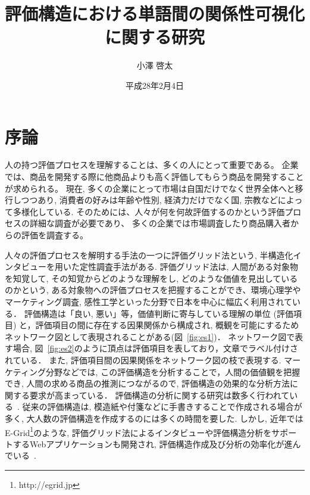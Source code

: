 \documentclass[syuuron]{kuee}
\title{評価構造における単語間の関係性可視化に関する研究}
\author{小澤 啓太}
\date{平成28年2月4日}
\begin{document}
\maketitle
\tableofcontents


\chapter{序論}
	人の持つ評価プロセスを理解することは、多くの人にとって重要である。
	企業では、商品を開発する際に他商品よりも高く評価してもらう商品を開発することが求められる。
	現在, 多くの企業にとって市場は自国だけでなく世界全体へと移行しつつあり, 
	消費者の好みは年齢や性別, 経済力だけでなく国, 宗教などによって多様化している. 
	そのためには、人々が何を何故評価するのかという評価プロセスの詳細な調査が必要であり、
	多くの企業では市場調査したり商品購入者からの評価を調査する。
	
	人々の評価プロセスを解明する手法の一つに評価グリッド法という, 半構造化インタビューを用いた定性調査手法がある. 
	評価グリッド法は, 人間がある対象物を知覚して, その知覚からどのような理解をし, どのような価値を見出しているのかという, 
	ある対象物への評価プロセスを把握することができ、環境心理学やマーケティング調査, 感性工学といった分野で日本を中心に幅広く利用されている\cite{sen1}．
	評価構造は「良い, 悪い」等，価値判断に寄与している理解の単位 (評価項目) と，評価項目の間に存在する因果関係から構成され, 
	概観を可能にするためネットワーク図として表現されることがある(図~\ref{fig:es1})．
	ネットワーク図で表す場合, 図~\ref{fig:es2}のように頂点は評価項目を表しており，文章でラベル付けされている．
	また, 評価項目間の因果関係をネットワーク図の枝で表現する. 
	マーケティング分野などでは, この評価構造を分析することで，人間の価値観を把握でき, 人間の求める商品の推測につながるので, 
	評価構造の効果的な分析方法に関する要求が高まっている\cite{egm6, egm7}．
	評価構造の分析に関する研究は数多く行われている~\cite{egm8, egm9}. 
	従来の評価構造は, 模造紙や付箋などに手書きすることで作成される場合が多く, 大人数の評価構造を作成するのには多くの時間を要した. 
	しかし, 近年ではE-Grid\footnote{http://egrid.jp}のような, 評価グリッド法によるインタビューや評価構造分析をサポートするWebアプリケーションも開発され, 
	評価構造作成及び分析の効率化が進んでいる~\cite{egm6, egm10}. 
	
\end{document}
